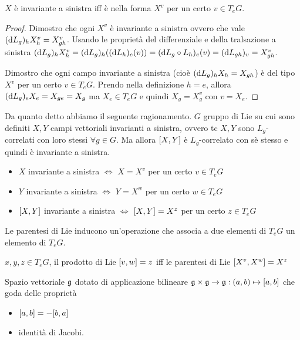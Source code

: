\begin{theorem}
    $X$ è invariante a sinistra iff è nella forma $X^v$ per un
    certo $v\in T_eG$.
\end{theorem}
\begin{proof}
    Dimostro che ogni $X^v$ è invariante a sinistra ovvero che vale
    $(\dd{L_g})_{h}X^v_h=X^v_{gh}$. Usando le proprietà del
    differenziale e della tralsazione a sinistra
    $(\dd{L_g})_{h}X^v_h=(\dd{L_g})_{h}((\dd{L_h})_{e}(v))=(\dd{L_g\circ
    L_h})_{e}(v)=(\dd{L_{gh}})_{v}=X^v_{gh}$.

    Dimostro che ogni campo invariante a sinistra (cioè
    $(\dd{L_g})_{h}X_h=X_{gh}$) è del tipo $X^v$ per un certo $v\in
    T_eG$. Prendo nella definizione $h=e$, allora
    $(\dd{L_g})_{e}X_e=X_{ge}=X_g$ ma $X_e\in T_eG$ e quindi
    $X_g=X^v_g$ con $v=X_e$.
    
\end{proof}

Da quanto detto abbiamo il seguente ragionamento.
$G$ gruppo di Lie su cui sono definiti $X,Y$ campi vettoriali
invarianti a sinistra, ovvero tc $X,Y$ sono $L_g$- correlati con
loro stessi $\forall g\in G$. Ma allora $\comm{X}{Y}$ è
$L_g$-correlato con sè stesso e quindi è invariante a sinistra.
\begin{itemize}
    \item $X$ invariante a sinistra $\iff$ $X=X^v$ per un certo
        $v\in T_eG$
    \item $Y$ invariante a sinistra $\iff$ $Y=X^w$ per un certo
        $w\in T_eG$
    \item $\comm{X}{Y}$ invariante a sinistra $\iff$
        $\comm{X}{Y}=X^z$ per un certo $z\in T_eG$
\end{itemize}
Le parentesi di Lie inducono un'operazione che associa a due
elementi di $T_eG$ un elemento di $T_eG$.

\begin{definition}
    $x,y,z\in T_eG$, il prodotto di Lie $\comm{v}{w}=z$ iff le
    parentesi di Lie $\comm{X^v}{X^w}=X^z$
\end{definition}

\begin{definition}
    Spazio vettoriale $\mathfrak{g}$ dotato di applicazione bilineare
    $\g\times\g\to\g:(a,b)\mapsto \comm{a}{b}$ che goda delle
    proprietà 
    \begin{itemize}
        \item $\comm{a}{b}=-\comm{b}{a}$ 
        \item identità di Jacobi.
    \end{itemize}
\end{definition}


